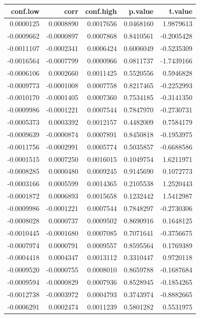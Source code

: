 \documentclass[]{tufte-handout}
\begin{document}
\begin{longtable}[]{@{}rrrrr@{}}
\toprule
conf.low & corr & conf.high & p.value & t.value \\
\midrule
\endhead
0.0000125 & 0.0008890 & 0.0017656 & 0.0468160 & 1.9879613 \\
-0.0009662 & -0.0000897 & 0.0007868 & 0.8410561 & -0.2005428 \\
-0.0011107 & -0.0002341 & 0.0006424 & 0.6006049 & -0.5235309 \\
-0.0016564 & -0.0007799 & 0.0000966 & 0.0811737 & -1.7439166 \\
-0.0006106 & 0.0002660 & 0.0011425 & 0.5520556 & 0.5946828 \\
-0.0009773 & -0.0001008 & 0.0007758 & 0.8217465 & -0.2252993 \\
-0.0010170 & -0.0001405 & 0.0007360 & 0.7534185 & -0.3141350 \\
-0.0009986 & -0.0001221 & 0.0007544 & 0.7847970 & -0.2730731 \\
-0.0005373 & 0.0003392 & 0.0012157 & 0.4482009 & 0.7584179 \\
-0.0009639 & -0.0000874 & 0.0007891 & 0.8450818 & -0.1953975 \\
-0.0011756 & -0.0002991 & 0.0005774 & 0.5035857 & -0.6688586 \\
-0.0001515 & 0.0007250 & 0.0016015 & 0.1049754 & 1.6211971 \\
-0.0008285 & 0.0000480 & 0.0009245 & 0.9145690 & 0.1072773 \\
-0.0003166 & 0.0005599 & 0.0014365 & 0.2105538 & 1.2520443 \\
-0.0001872 & 0.0006893 & 0.0015658 & 0.1232442 & 1.5412987 \\
-0.0009986 & -0.0001221 & 0.0007544 & 0.7848297 & -0.2730306 \\
-0.0008028 & 0.0000737 & 0.0009502 & 0.8690916 & 0.1648125 \\
-0.0010445 & -0.0001680 & 0.0007085 & 0.7071641 & -0.3756675 \\
-0.0007974 & 0.0000791 & 0.0009557 & 0.8595564 & 0.1769389 \\
-0.0004418 & 0.0004347 & 0.0013112 & 0.3310447 & 0.9720118 \\
-0.0009520 & -0.0000755 & 0.0008010 & 0.8659788 & -0.1687684 \\
-0.0009594 & -0.0000829 & 0.0007936 & 0.8528945 & -0.1854265 \\
-0.0012738 & -0.0003972 & 0.0004793 & 0.3743974 & -0.8882665 \\
-0.0006291 & 0.0002474 & 0.0011239 & 0.5801282 & 0.5531975 \\

\end{longtable}
\end{document}
